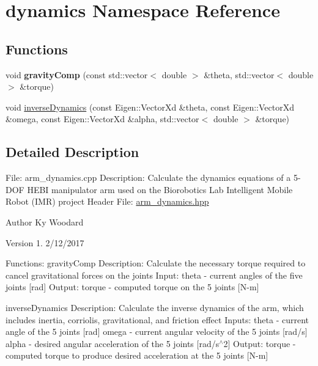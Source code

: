 \hypertarget{namespacedynamics}{}\section{dynamics Namespace Reference}
\label{namespacedynamics}
\subsection*{Functions}
\begin{DoxyCompactItemize}
\item 
void {\bfseries gravity\+Comp} (const std\+::vector$<$ double $>$ \&theta, std\+::vector$<$ double $>$ \&torque)\hypertarget{namespacedynamics_a00e914433e77671dac03be0ca7d34e1f}{}\label{namespacedynamics_a00e914433e77671dac03be0ca7d34e1f}

\item 
void \hyperlink{namespacedynamics_a6f9761c4fbb20c590cfb1ae345e2ff61}{inverse\+Dynamics} (const Eigen\+::\+Vector\+Xd \&theta, const Eigen\+::\+Vector\+Xd \&omega, const Eigen\+::\+Vector\+Xd \&alpha, std\+::vector$<$ double $>$ \&torque)
\end{DoxyCompactItemize}


\subsection{Detailed Description}
File\+: arm\+\_\+dynamics.\+cpp Description\+: Calculate the dynamics equations of a 5-\/\+D\+OF H\+E\+BI manipulator arm used on the Biorobotics Lab Intelligent Mobile Robot (I\+MR) project Header File\+: \hyperlink{arm__dynamics_8hpp_source}{arm\+\_\+dynamics.\+hpp}

\begin{DoxyAuthor}{Author}
Ky Woodard 
\end{DoxyAuthor}
\begin{DoxyVersion}{Version}
1. 2/12/2017
\end{DoxyVersion}
Functions\+: gravity\+Comp Description\+: Calculate the necessary torque required to cancel gravitational forces on the joints Input\+: theta -\/ current angles of the five joints \mbox{[}rad\mbox{]} Output\+: torque -\/ computed torque on the 5 joints \mbox{[}N-\/m\mbox{]}

inverse\+Dynamics Description\+: Calculate the inverse dynamics of the arm, which includes inertia, corriolis, gravitational, and friction effect Inputs\+: theta -\/ current angle of the 5 joints \mbox{[}rad\mbox{]} omega -\/ current angular velocity of the 5 joints \mbox{[}rad/s\mbox{]} alpha -\/ desired angular acceleration of the 5 joints \mbox{[}rad/s$^\wedge$2\mbox{]} Output\+: torque -\/ computed torque to produce desired acceleration at the 5 joints \mbox{[}N-\/m\mbox{]}

